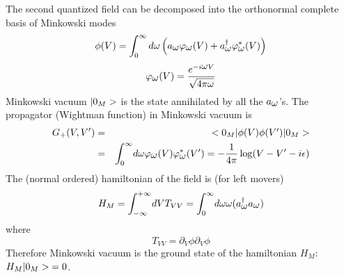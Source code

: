 The second quantized field can be decomposed into the orthonormal
complete basis of
Minkowski modes
\begin{equation} \phi(V) = \int_0^{\infty} d\omega  \left( a_{\mbox{$ \omega $}}
\varphi_{\mbox{$ \omega $}} (V) + a_{\mbox{$ \omega $}}^\dagger \varphi_{\mbox{$ \omega $}}^* (V)\right)
\label{threethreeii} \end{equation} \begin{equation} \varphi_{\mbox{$ \omega $}} (V) = {
e^{-i\mbox{$ \omega $} V} \over \sqrt{4 \pi \mbox{$ \omega $}}} \label{threethreeiii}
\end{equation}
Minkowski vacuum $\mbox{$ \vert 0_M > $}$ is the state
 annihilated by all the $a_{\mbox{$ \omega $}}$'s. The
propagator (Wightman function)
in Minkowski vacuum is \begin{eqnarray}
G_+(V,V^\prime)
&=&\mbox{$ \mbox{$ < 0_M \vert $}  \phi(V)\phi(V^\prime) \mbox{$ \vert 0_M > $} $} \nonumber\\
&=&  \int_0^{\infty} \! d\mbox{$ \omega $} \varphi_{\mbox{$ \omega $}} (V) \varphi_{\mbox{$ \omega $}}^*(V^\prime) =
-{1 \over 4 \pi} \log (V-V^\prime
- i \mbox{$ \epsilon $}) \label{threethreeiv} \end{eqnarray} The (normal ordered)
hamiltonian of the field is
(for left movers) \begin{equation} H_M= \int_{-\infty}^{+\infty} \! dV T_{VV}
=  \int_0^{\infty} \! d\mbox{$ \omega $} {\mbox{$ \omega $}}  (
a_{\mbox{$ \omega $}}^\dagger  a_{\mbox{$ \omega $}} ) \label{threethreev} \end{equation}
where
\begin{equation}
 T_{VV} = \partial_V \phi  \partial_V \phi
\label{threetvv}
\end{equation}
 Therefore Minkowski vacuum is the ground state of the hamiltonian $H_M$:
$H_M \mbox{$ \vert 0_M > $} =0$.

